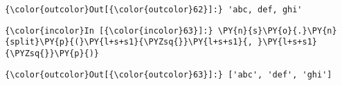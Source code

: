             \begin{Verbatim}[commandchars=\\\{\}]
{\color{outcolor}Out[{\color{outcolor}62}]:} 'abc, def, ghi'
\end{Verbatim}
        
    \begin{Verbatim}[commandchars=\\\{\}]
{\color{incolor}In [{\color{incolor}63}]:} \PY{n}{s}\PY{o}{.}\PY{n}{split}\PY{p}{(}\PY{l+s+s1}{\PYZsq{}}\PY{l+s+s1}{, }\PY{l+s+s1}{\PYZsq{}}\PY{p}{)}
\end{Verbatim}

            \begin{Verbatim}[commandchars=\\\{\}]
{\color{outcolor}Out[{\color{outcolor}63}]:} ['abc', 'def', 'ghi']
\end{Verbatim}
